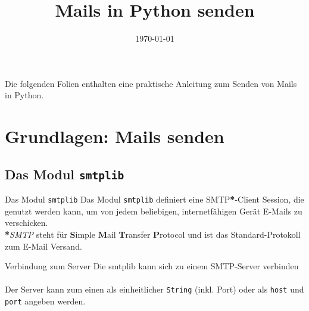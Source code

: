 


\newcommand{\topic}{
	Mails in Python senden
}

\title{\topic}
\supertitle{\course}
\date{\today}



\maketitle

\begin{frame}
	\tableofcontents
\end{frame}


\begin{frame}
	Die folgenden Folien enthalten eine praktische Anleitung zum Senden von Mails in Python.
\end{frame}


\section{Grundlagen: Mails senden}
\subsection{Das Modul \texttt{smtplib}}
\begin{frame}[fragile]{Das Modul \texttt{smtplib}}
	Das Modul \texttt{smtplib} definiert eine SMTP\textbf{*}-Client Session, die genutzt werden kann, um von jedem beliebigen, internetf\"ahigen Ger\"at E-Mails zu verschicken. \\[1cm]
	
	\textbf{*}\textit{SMTP} steht für \textbf{S}imple \textbf{M}ail \textbf{T}ransfer 
	\textbf{P}rotocol und ist das Standard-Protokoll zum E-Mail Versand.
\end{frame}

\begin{frame}[fragile]{Verbindung zum Server}
	Die smtplib kann sich zu einem SMTP-Server verbinden\\[.5cm]
	
	
	\ \\[.25cm]
	Der Server kann zum einen als einheitlicher \texttt{String} (inkl. Port) oder als \texttt{host} und \texttt{port} angeben werden.
\end{frame}

